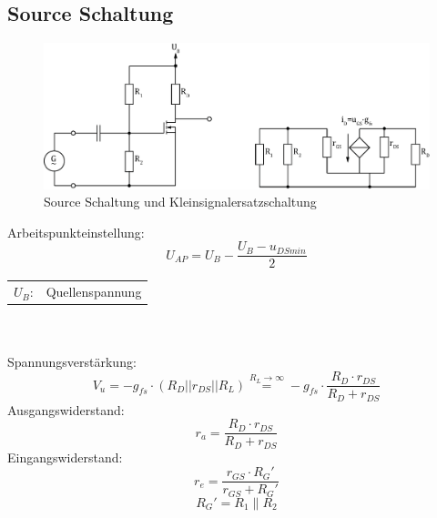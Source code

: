 



\subsection{Source Schaltung}
\begin{figure}[h!]
	\centering
	\includegraphics[width = \linewidth]{../fig/fet_source.pdf}
	\caption{Source Schaltung und Kleinsignalersatzschaltung}
	\label{fet:sourceschaltung}
\end{figure}
\noindent
Arbeitspunkteinstellung:
\[ U_{AP} = U_B - \frac{U_B - u_{DSmin}}{2} \]
\begin{tabular}{@{}ll}
  $U_B$:        & Quellenspannung
\end{tabular}
\\\\
Spannungsverstärkung:
\[ V_u = -g_{fs} \cdot (R_D || r_{DS} || R_L) \stackrel{R_L \to \infty}{=} 
-g_{fs} \cdot \frac{R_D \cdot r_{DS}}{R_D + r_{DS}} \]
Ausgangswiderstand:
\[ r_a = \frac{R_D \cdot r_{DS}}{R_D + r_{DS}} \]
Eingangswiderstand:
\[ r_e = \frac{r_{GS} \cdot R_G'}{r_{GS} + R_G'}\]
\[ R_G' = R_1 \parallel R_2 \]
